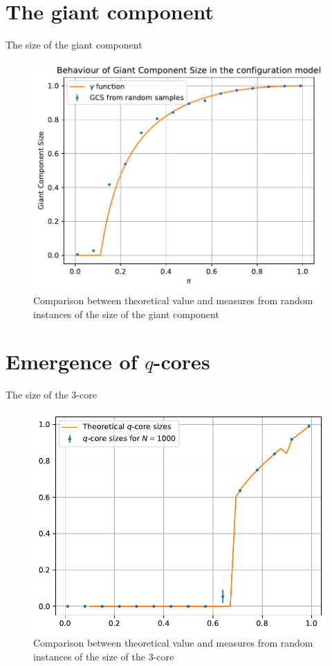 \documentclass[handout]{beamer}
\begin{document}
\section{The giant component}

\begin{frame}{The size of the giant component}
    \begin{figure}
        \centering
        \includegraphics[height=.7\textheight]{gcs}
        \caption{Comparison between theoretical value and measures from random
        instances of the size of the giant component}
        \label{fig:gcs}
    \end{figure}
\end{frame}

\section{Emergence of $q$-cores}

\begin{frame}{The size of the 3-core}
    \begin{figure}
        \centering
        \includegraphics[height=.7\textheight]{qcore}
        \caption{Comparison between theoretical value and measures from random
        instances of the size of the 3-core}
        \label{fig:gcs}
    \end{figure}
\end{frame}
\end{document}
